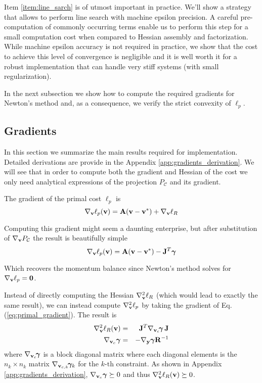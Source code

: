 Item \ref{item:line_sarch} is of utmost important in practice. We'll show a
strategy that allows to perform line search with machine epsilon precision. A
careful pre-computation of commonly occurring terms enable us to perform this
step for a small computation cost when compared to Hessian assembly and
factorization. While machine epsilon accuracy is not required in practice, we
show that the cost to achieve this level of convergence is negligible and it is
well worth it for a robust implementation that can handle very stiff systems
(with small regularization).

In the next subsection we show how to compute the required gradients for
Newton's method and, as a consequence, we verify the strict convexity of
$\ell_p$.


\subsection{Gradients}
\label{sec:gradients}

In this section we summarize the main results required for implementation.
Detailed derivations are provide in the Appendix \ref{app:gradients_derivation}.
We will see that in order to compute both the gradient and Hessian of the cost
we only need analytical expressions of the projection $P_\mathcal{C}$ and its
gradient.

The gradient of the primal cost $\ell_p$ is
\begin{equation}
	\nabla_{\mathbf{v}}\ell_p({\mathbf{v}}) = {\mathbf{A}}({\mathbf{v}}-{\mathbf{v}}^*) + \nabla_{\mathbf{v}}\ell_R
\end{equation}

Computing this gradient might seem a daunting enterprise, but after substitution
of $\nabla_{\mathbf{v}}P_\mathcal{C}$ the result is beautifully simple
\begin{equation}
	\nabla_\mf{v}\ell_p(\mf{v}) = \mf{A}(\mf{v}-\mf{v}^*) - \mf{J}^T\bgamma
	\label{eq:primal_gradient}
\end{equation}

Which recovers the momentum balance since Newton's method solves for
$\nabla_{\mathbf{v}}\ell_p={\mathbf{0}}$.

Instead of directly computing the Hessian $\nabla_{\mathbf{v}}^2\ell_R$ (which would
lead to exactly the same result), we can instead compute $\nabla_{\mathbf{v}}^2\ell_p$
by taking the gradient of Eq. (\ref{eq:primal_gradient}). The result is
\begin{eqnarray}
	\nabla_\mf{v}^2\ell_R(\mf{v}) &=&
	\mf{J}^T\nabla_{\mf{v}_c}\!\bgamma\,\mf{J}\nonumber\\
	\nabla_{\mf{v}_c}\bgamma &=& -\nabla_\mf{y}\bgamma \mf{R}^{-1}
	\label{eq:ellR_hessian}
\end{eqnarray}
where $\nabla_{{\mathbf{v}}_c}\!{\bm\gamma}$ is a block diagonal matrix where each
diagonal elements is the $n_k\times n_k$ matrix
$\nabla_{{\mathbf{v}}_{c,k}}\!{\bm\gamma}_k$ for the $k\text{-th}$ constraint. As shown in
Appendix \ref{app:gradients_derivation}, $\nabla_{{\mathbf{v}}_c}{\bm\gamma}\succeq 0$ and
thus $\nabla_{\mathbf{v}}^2\ell_R({\mathbf{v}})\succeq 0$.

